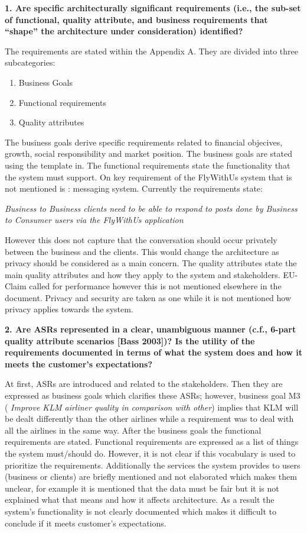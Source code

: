 \textbf{1. Are specific architecturally significant requirements (i.e., the sub-set of functional, quality attribute, and business requirements that “shape” the architecture under consideration) identified? }

The requirements are stated within the Appendix A. They are divided into three subcategories: 
\begin{enumerate}
\item Business Goals
\item Functional requirements
\item Quality attributes
\end{enumerate}

The business goals derive specific requirements related to financial objecives, growth, social responsibility and market position. The business goals are stated using the template in\cite{clemens}. \newline The functional requirements state the functionality that the system must support. On key requirement of the FlyWithUs system that is not mentioned is : messaging system. Currently the requirements state:

\emph{Business to Business clients need to be able to respond to posts done by Business to Consumer users via the FlyWithUs application}

However this does not capture that the conversation should occur privately between the business and the clients. This would change the architecture
as privacy should be considered as a main concern. \newline
The quality attributes state the main quality attributes and how they apply to the system and stakeholders. EU-Claim called for performance however this is not mentioned elsewhere in the document. Privacy and security are taken as one while it is not mentioned how privacy applies towards the system.

\vspace{.5cm}
\textbf{2. Are ASRs represented in a clear, unambiguous manner (c.f., 6-part quality attribute scenarios [Bass 2003])? Is the utility of the requirements documented in terms of what the system does and how it meets the customer’s expectations? }

At first, ASRs are introduced and related to the stakeholders. Then they are expressed as business goals which clarifies these ASRs; however, business goal M3 (\textit{ Improve KLM airliner quality in comparison with other}) implies that KLM will be dealt differently than the other airlines while a requirement was to deal with all the airlines in the same way. After the business goals the functional requirements are stated. Functional requirements are expressed as a list of things the system must/should do. However, it is not clear if this vocabulary is used to prioritize the requirements. Additionally the services the system provides to users (business or clients) are briefly mentioned and not elaborated which makes them unclear, for example it is mentioned that the data must be fair but it is not explained what that means and how it affects architecture. As a result the system's functionality is not clearly documented which makes it difficult to conclude if it meets customer's expectations.

